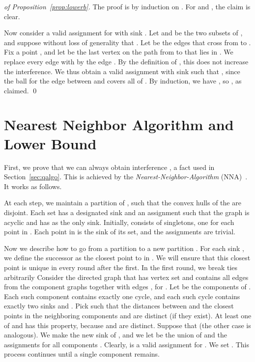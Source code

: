 \documentclass[envcountsect,envcountsame,runningheads,a4paper]{llncs}
\begin{document}
\begin{proof}[of Proposition~\ref{prop:lowerb}]
The proof is by induction on . For  and , the claim
is clear.


Now consider a valid assignment  for  with sink . Let  and
 be the two  subsets of , and suppose
without loss of generality that .
Let  be the edges that cross from  to .
Fix a point , and let  be the last vertex on the
path from  to  that lies in . We replace every
edge  with 
by the edge . By the definition of , this does not increase the interference.
We thus obtain a valid assignment
 with sink  such that
, since the ball for the edge
between  and  covers all of . By induction,
we have , so , as claimed.
\qed{}
\end{proof}

\section{Nearest Neighbor Algorithm and Lower Bound}\label{sec:nna}

First, we prove  that we can always obtain
interference , a fact used in Section~\ref{sec:qalgo}.
This is achieved by the \emph{Nearest-Neighbor-Algorithm}
(NNA)~\cite{RickenbachWaZo09,Korman12}.
It works as follows.

At each step, we maintain a partition
 of , such that
the convex hulls of the  are disjoint. Each set 
has a designated sink  and an assignment
 such that the graph
 is acyclic and has  as the only sink.
Initially,  consists of  singletons, one
for each point in . Each point in  is the sink of its
set, and the assignments are trivial.

Now we describe how to go from a partition
 to a new partition .
For each sink , we define the successor  as the closest
point to  in . We will ensure that this closest
point is unique in every round after the first.
In the first round, we break
ties arbitrarily
Consider the directed graph  that has vertex set  and
contains all edges from the component graphs  together
with edges , for . Let  be the
components of . Each such component  contains exactly one cycle,
and each such cycle contains exactly two sinks  and .
Pick  such that the distances between
 and the closest points in the neighboring components
 and  are distinct (if they exist). At least
one of  and  has this property, because  and
 are distinct. Suppose that  (the other case
is analogous). We make  the new sink of , and we
let  be the union of  and
the assignments  for all
components . Clearly,  is a valid assignment
for . We set .
This process continues until a single component remains.
\end{document}
